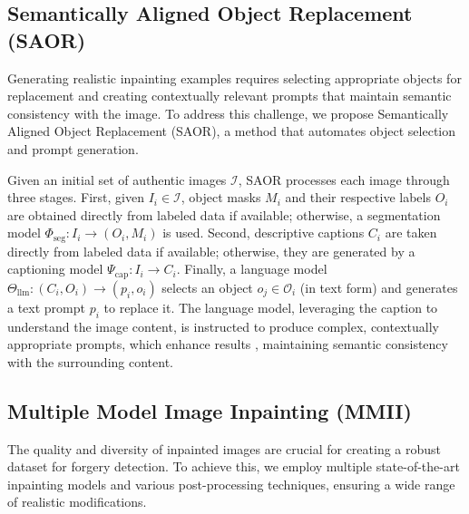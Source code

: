 
\subsection{Semantically Aligned Object Replacement (SAOR)}
\label{sec:SAOR}

Generating realistic inpainting examples requires selecting appropriate objects for replacement and creating contextually relevant prompts that maintain semantic consistency with the image. To address this challenge, we propose Semantically Aligned Object Replacement (SAOR), a method that automates object selection and prompt generation.

Given an initial set of authentic images $\mathcal{I}$, SAOR processes each image through three stages. First, given $I_i \in \mathcal{I}$, object masks $M_i$ and their respective labels $O_i$ are obtained directly from labeled data if available; otherwise, a segmentation model $\Phi_\text{seg}: I_i \rightarrow (O_i, M_i)$ is used. Second, descriptive captions $C_i$ are taken directly from labeled data if available; otherwise, they are generated by a captioning model $\Psi_\text{cap}: I_i \rightarrow C_i$. Finally, a language model $\Theta_\text{llm}: (C_i, O_i) \rightarrow (p_i, o_i)$ selects an object $o_j \in \mathcal{O}_i$ (in text form) and generates a text prompt $p_i$ to replace it. The language model, leveraging the caption to understand the image content, is instructed to produce complex, contextually appropriate prompts, which enhance results \cite{rosenman2024neuropromptsadaptiveframeworkoptimize, manas2024improvingtexttoimageconsistencyautomatic}, maintaining semantic consistency with the surrounding content.

\vspace{-5pt}
\subsection{Multiple Model Image Inpainting (MMII)}
\label{sec:mmii}

The quality and diversity of inpainted images are crucial for creating a robust dataset for forgery detection. To achieve this, we employ multiple state-of-the-art inpainting models and various post-processing techniques, ensuring a wide range of realistic modifications.

